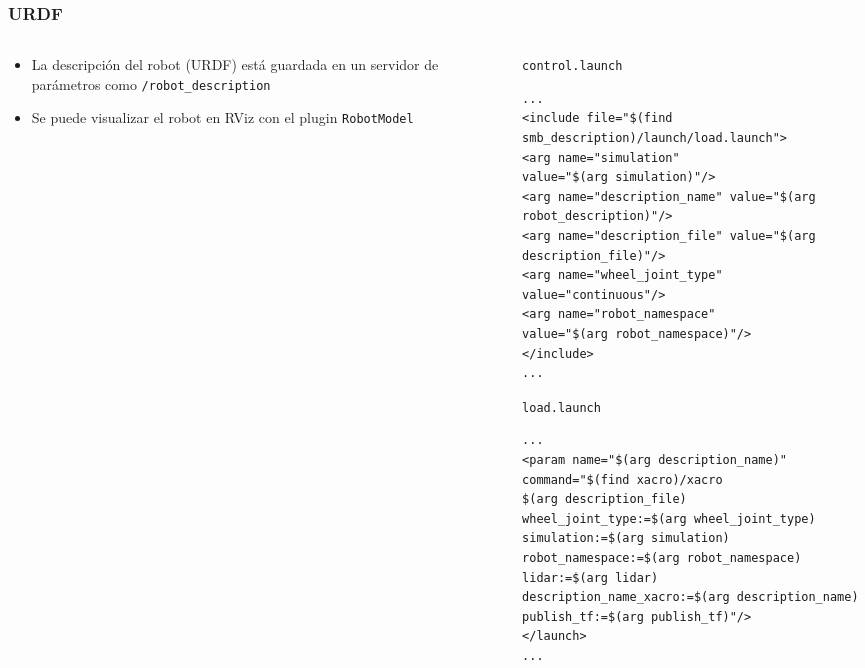 \begin{frame}[fragile]
    \frametitle{URDF}
    
\footnotesize

\begin{columns}
\begin{column}{0.4\textwidth}
\begin{itemize}
\item La descripción del robot (URDF) está guardada en un servidor de parámetros como \lstinline[style=bash]{/robot_description}
\item Se puede visualizar el robot en RViz con el plugin \lstinline[style=bash]{RobotModel}
\end{itemize}
\end{column}
\begin{column}{0.6\textwidth}

\lstinline[style=bash]{control.launch}
\begin{lstlisting}[style=xml,basicstyle=\tiny]
...
<include file="$(find smb_description)/launch/load.launch">
<arg name="simulation"
value="$(arg simulation)"/>
<arg name="description_name" value="$(arg robot_description)"/>
<arg name="description_file" value="$(arg description_file)"/>
<arg name="wheel_joint_type" value="continuous"/>
<arg name="robot_namespace"
value="$(arg robot_namespace)"/>
</include>
...
\end{lstlisting}

\lstinline[style=bash]{load.launch}
\begin{lstlisting}[style=xml,basicstyle=\tiny]
...
<param name="$(arg description_name)" command="$(find xacro)/xacro
$(arg description_file)
wheel_joint_type:=$(arg wheel_joint_type)
simulation:=$(arg simulation)
robot_namespace:=$(arg robot_namespace)
lidar:=$(arg lidar)
description_name_xacro:=$(arg description_name)
publish_tf:=$(arg publish_tf)"/>
</launch>
...
\end{lstlisting}
	
\end{column}
\end{columns}

\end{frame}

